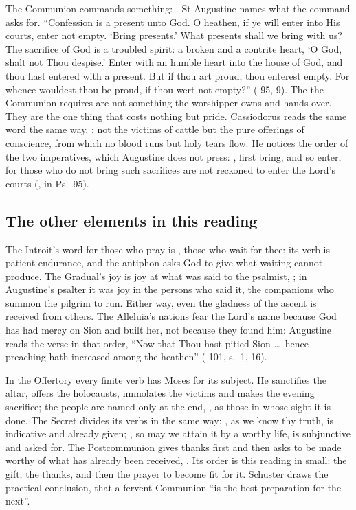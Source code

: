 The Communion commands something: . St
Augustine names what the command asks for. ``Confession is a present unto God.
O heathen, if ye will enter into His courts, enter not empty. `Bring presents.'
What presents shall we bring with us? The sacrifice of God is a troubled
spirit: a broken and a contrite heart, `O God, shalt not Thou despise.' Enter
with an humble heart into the house of God, and thou hast entered with a
present. But if thou art proud, thou enterest empty. For whence wouldest thou be
proud, if thou wert not empty?'' ( 95, 9). The
 the Communion requires are not something the worshipper owns
and hands over. They are the one thing that costs nothing but pride. Cassiodorus
reads the same word the same way, : not the victims of cattle but the pure offerings of conscience, from
which no blood runs but holy tears flow. He notices the order of the two
imperatives, which Augustine does not press: , first bring, and so enter, for those who do
not bring such sacrifices are not reckoned to enter the Lord's courts
(, in Ps.~95).

\subsection{The other elements in this reading}

The Introit's word for those who pray is , those who
wait for thee: its verb is patient endurance, and the antiphon asks God to give
what waiting cannot produce. The Gradual's joy is joy at what was said to the
psalmist, ; in Augustine's psalter it was
joy in the persons who said it, the companions who summon the pilgrim to run.
Either way, even the gladness of the ascent is received from others. The
Alleluia's nations fear the Lord's name because God has had mercy on Sion and
built her, not because they found him: Augustine reads the verse in that order,
``Now that Thou hast pitied Sion \dots\ hence preaching hath increased among
the heathen'' ( 101, s.~1, 16).

In the Offertory every finite verb has Moses for its subject. He sanctifies the
altar, offers the holocausts, immolates the victims and makes the evening
sacrifice; the people are named only at the end, , as those in whose sight it is done. The
Secret divides its verbs in the
same way: , as we know thy truth, is
indicative and already given; , so may
we attain it by a worthy life, is subjunctive and asked for. The Postcommunion
gives thanks first and then asks to be made worthy of what has already been
received, . Its order is this
reading in small: the gift, the thanks, and then the prayer to become fit for
it. Schuster draws the practical conclusion, that a fervent Communion ``is the
best preparation for the next''.

